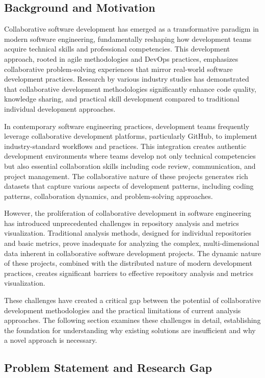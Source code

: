 \documentclass[12pt,a4paper]{article}
\begin{document}
\subsection{Background and Motivation}

Collaborative software development has emerged as a transformative paradigm in modern software engineering, fundamentally reshaping how development teams acquire technical skills and professional competencies. This development approach, rooted in agile methodologies and DevOps practices, emphasizes collaborative problem-solving experiences that mirror real-world software development practices. Research by various industry studies has demonstrated that collaborative development methodologies significantly enhance code quality, knowledge sharing, and practical skill development compared to traditional individual development approaches.

In contemporary software engineering practices, development teams frequently leverage collaborative development platforms, particularly GitHub, to implement industry-standard workflows and practices. This integration creates authentic development environments where teams develop not only technical competencies but also essential collaboration skills including code review, communication, and project management. The collaborative nature of these projects generates rich datasets that capture various aspects of development patterns, including coding patterns, collaboration dynamics, and problem-solving approaches.

However, the proliferation of collaborative development in software engineering has introduced unprecedented challenges in repository analysis and metrics visualization. Traditional analysis methods, designed for individual repositories and basic metrics, prove inadequate for analyzing the complex, multi-dimensional data inherent in collaborative software development projects. The dynamic nature of these projects, combined with the distributed nature of modern development practices, creates significant barriers to effective repository analysis and metrics visualization.

These challenges have created a critical gap between the potential of collaborative development methodologies and the practical limitations of current analysis approaches. The following section examines these challenges in detail, establishing the foundation for understanding why existing solutions are insufficient and why a novel approach is necessary.

\subsection{Problem Statement and Research Gap}
\end{document}
